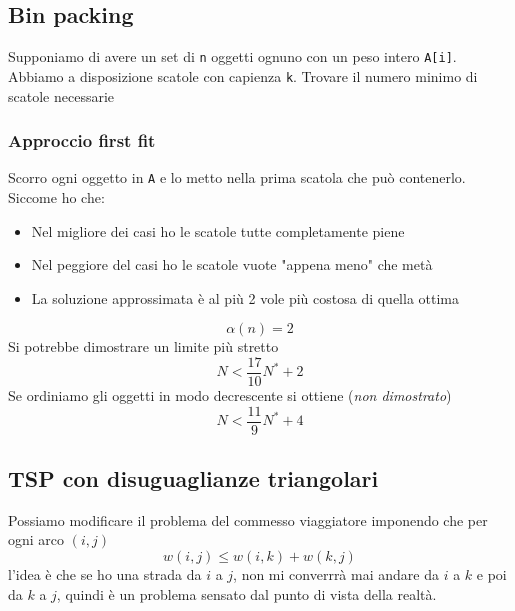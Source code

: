 \subsection{Bin packing}
Supponiamo di avere un set di \verb|n| oggetti ognuno con un peso intero \verb|A[i]|. Abbiamo a disposizione scatole con capienza \verb|k|. Trovare il numero minimo di scatole necessarie
\subsubsection{Approccio first fit}
Scorro ogni oggetto in \verb|A| e lo metto nella prima scatola che può contenerlo. Siccome ho che:
\begin{itemize}
	\item Nel migliore dei casi ho le scatole tutte completamente piene
	\item Nel peggiore del casi ho le scatole vuote "appena meno" che metà
	\item La soluzione approssimata è al più 2 vole più costosa di quella ottima
\end{itemize}
\[
	\alpha \left(n\right) = 2
\]
Si potrebbe dimostrare un limite più stretto
\[
	N < \frac{17}{10}N^{*} + 2
\]
Se ordiniamo gli oggetti in modo decrescente si ottiene (\textit{non dimostrato})
\[
	N < \frac{11}{9} N^{*} + 4
\]

\subsection{TSP con disuguaglianze triangolari}
Possiamo modificare il problema del commesso viaggiatore imponendo che per ogni arco $ \left(i,j\right) $
\[
	w\left(i,j\right) \le w\left(i,k\right) + w\left(k,j\right)
\]
l'idea è che se ho una strada da $ i $ a $ j $, non mi converrrà mai andare da $ i $ a $ k $ e poi da $ k $ a $ j $, quindi è un problema sensato dal punto di vista della realtà.
